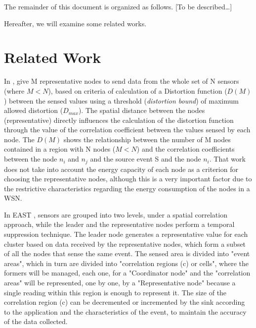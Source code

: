 \documentclass[conference]{IEEEtran}
\begin{document}


The remainder of this document is organized as follows. [To be described\ldots]

Hereafter, we will examine some related works.

\section{Related Work}

In \cite{Vuran2004}, give M representative nodes to send data from the
whole set of N sensors (where $M < N$), based on criteria of calculation of a
Distortion function ($D(M)$) between the sensed values using a threshold
(\textit{distortion bound}) of maximum allowed distortion ($D_{max}$).
The spatial distance between the nodes (representative) directly influences the
calculation of the distortion function through the value of the correlation
coefficient between the values sensed by each node.
The $D(M)$ shows the relationship between the number of M nodes contained in a
region with N nodes ($M < N$) and the correlation coefficients between the node
$n_i$ and $n_j$ and the source event S and the node $n_i$.
That work does not take into account the energy capacity of each node as a
criterion for choosing the representative nodes, although this is a very
important factor due to the restrictive characteristics regarding the energy
consumption of the nodes in a WSN.

In EAST \cite{Villas2012}, sensors are grouped into two levels, under a spatial
correlation approach, while the leader and the representative nodes perform a
temporal suppression technique.
The leader node generates a representative value for each cluster based on data
received by the representative nodes, which form a subset of all the nodes that
sense the same event. The sensed area is divided into "event areas", which in
turn are divided into "correlation regions (c) or cells", where the formers will
be managed, each one, for a "Coordinator node" and the "correlation areas" will
be represented, one by one, by a "Representative node" because a single reading
within this region is enough to represent it.
The size of the correlation region (c) can be decremented or incremented by the
sink according to the application and the characteristics of the event, to
maintain the accuracy of the data collected.
\end{document}

